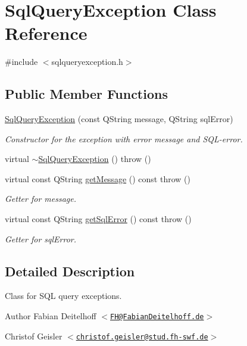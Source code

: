 \hypertarget{classSqlQueryException}{
\section{\-Sql\-Query\-Exception \-Class \-Reference}
\label{d2/d2a/classSqlQueryException}
}


{\ttfamily \#include $<$sqlqueryexception.\-h$>$}

\subsection*{\-Public \-Member \-Functions}
\begin{DoxyCompactItemize}
\item 
\hyperlink{classSqlQueryException_ab3c79825b6af9bea44f7dfd19dbe3466}{\-Sql\-Query\-Exception} (const \-Q\-String message, \-Q\-String sql\-Error)
\begin{DoxyCompactList}\small\item\em \-Constructor for the exception with error message and \-S\-Q\-L-\/error. \end{DoxyCompactList}\item 
virtual \hyperlink{classSqlQueryException_abe2582f3b9f24619a7de269d7e188124}{$\sim$\-Sql\-Query\-Exception} ()  throw ()
\item 
virtual const \-Q\-String \hyperlink{classSqlQueryException_a2052bb52dc994f7909e5e5fbf1a4fddf}{get\-Message} () const   throw ()
\begin{DoxyCompactList}\small\item\em \-Getter for message. \end{DoxyCompactList}\item 
virtual const \-Q\-String \hyperlink{classSqlQueryException_a59132b67e3b6a95390bdba73641f0d51}{get\-Sql\-Error} () const   throw ()
\begin{DoxyCompactList}\small\item\em \-Getter for sql\-Error. \end{DoxyCompactList}\end{DoxyCompactItemize}


\subsection{\-Detailed \-Description}
\-Class for \-S\-Q\-L query exceptions.

\begin{DoxyAuthor}{\-Author}
\-Fabian \-Deitelhoff $<$\href{mailto:FH@FabianDeitelhoff.de}{\tt \-F\-H@\-Fabian\-Deitelhoff.\-de}$>$ 

\-Christof \-Geisler $<$\href{mailto:christof.geisler@stud.fh-swf.de}{\tt christof.\-geisler@stud.\-fh-\/swf.\-de}$>$ 
\end{DoxyAuthor}


